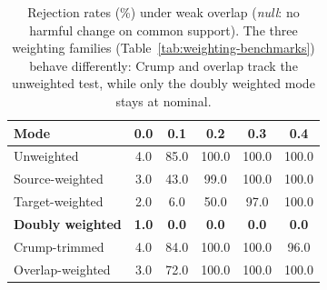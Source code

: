 \begin{table}[t]
  \centering
  \small
  \caption{Rejection rates (\%) under weak overlap (\emph{null}: no harmful change on common support).
    The three weighting families (Table~\ref{tab:weighting-benchmarks}) behave
    differently: Crump and overlap track the unweighted test, while only the
    doubly weighted mode stays at nominal.}
  \label{tab:calibration-reject}
  \begin{tabular}{lccccc}
    \toprule
    Mode & 0.0 & 0.1 & 0.2 & 0.3 & 0.4\\
    \midrule
    Unweighted & 4.0 & 85.0 & 100.0 & 100.0 & 100.0\\
    Source-weighted & 3.0 & 43.0 & 99.0 & 100.0 & 100.0\\
    Target-weighted & 2.0 & 6.0 & 50.0 & 97.0 & 100.0\\
    \textbf{Doubly weighted} & \textbf{1.0} & \textbf{0.0} & \textbf{0.0} & \textbf{0.0} & \textbf{0.0}\\
    Crump-trimmed & 4.0 & 84.0 & 100.0 & 100.0 & 96.0\\
    Overlap-weighted & 3.0 & 72.0 & 100.0 & 100.0 & 100.0\\
    \bottomrule
  \end{tabular}
\end{table}
